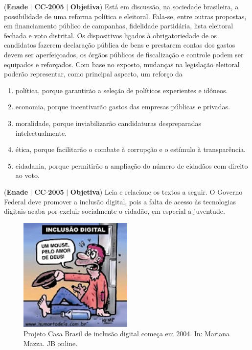 \documentclass{exam}
\begin{document}
\begin{questions}
\question (\textbf{Enade} $|$ \textbf{CC}-\textbf{2005} $|$ \textbf{Objetiva})
Está em discussão, na sociedade brasileira, a possibilidade de uma
reforma política e eleitoral. Fala-se, entre outras propostas, em
financiamento público de campanhas, fidelidade partidária, lista
eleitoral fechada e voto distrital. Os dispositivos ligados à
obrigatoriedade de os candidatos fazerem declaração pública de
bens e prestarem contas dos gastos devem ser aperfeiçoados, os
órgãos públicos de fiscalização e controle podem ser equipados
e reforçados.
Com base no exposto, mudanças na legislação eleitoral poderão
representar, como principal aspecto, um reforço da
	\begin{enumerate}[label=\alph*)]
		\item  política, porque garantirão a seleção de políticos experientes
e idôneos.
		\item  economia, porque incentivarão gastos das empresas públicas
e privadas.
		\item  moralidade, porque inviabilizarão candidaturas despreparadas
intelectualmente.
		\item  ética, porque facilitarão o combate à corrupção e o estímulo
à transparência.
		\item  cidadania, porque permitirão a ampliação do número de
cidadãos com direito ao voto.
	\end{enumerate}

\question (\textbf{Enade} $|$ \textbf{CC}-\textbf{2005} $|$ \textbf{Objetiva})
Leia e relacione os textos a seguir.
O Governo Federal deve
promover a inclusão digital, pois
a falta de acesso às tecnologias
digitais acaba por excluir
socialmente o cidadão, em
especial a juventude.

\begin{figure}[H]
	\begin{center}
		\includegraphics[width=0.5\textwidth]{CIENCIA_DA_COMPUTACAO_Prova2005-utf8_figuras/fig-0001.jpg}
		\caption{Projeto Casa Brasil de inclusão digital começa em 2004. In: Mariana Mazza. JB online.}
	\end{center}
\end{figure}



\end{questions}
\end{document}
